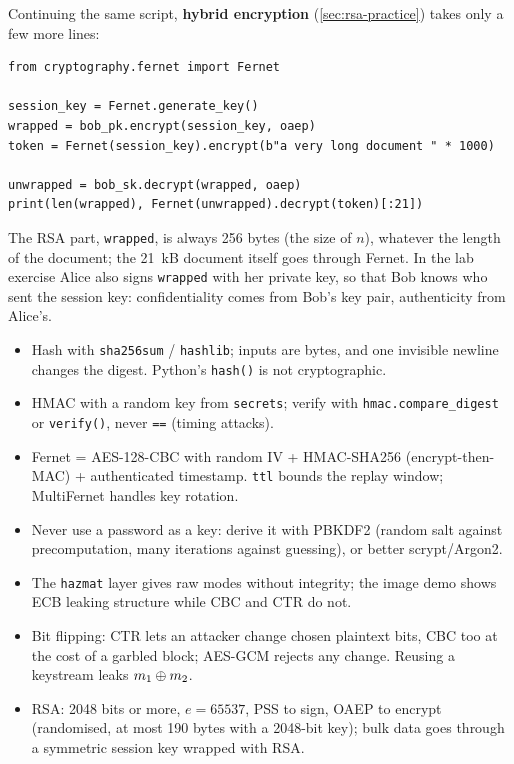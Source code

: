 Continuing the same script, \textbf{hybrid encryption} (\cref{sec:rsa-practice}) takes only a few more lines:

\begin{verbatim}
from cryptography.fernet import Fernet

session_key = Fernet.generate_key()
wrapped = bob_pk.encrypt(session_key, oaep)
token = Fernet(session_key).encrypt(b"a very long document " * 1000)

unwrapped = bob_sk.decrypt(wrapped, oaep)
print(len(wrapped), Fernet(unwrapped).decrypt(token)[:21])
\end{verbatim}

The RSA part, \texttt{wrapped}, is always 256 bytes (the size of $n$), whatever the length of the document; the 21~kB document itself goes through Fernet. In the lab exercise Alice also signs \texttt{wrapped} with her private key, so that Bob knows who sent the session key: confidentiality comes from Bob's key pair, authenticity from Alice's.

\begin{summary}
\begin{itemize}
    \item Hash with \texttt{sha256sum} / \texttt{hashlib}; inputs are bytes, and one invisible newline changes the digest. Python's \texttt{hash()} is not cryptographic.
    \item HMAC with a random key from \texttt{secrets}; verify with \texttt{hmac.compare\_digest} or \texttt{verify()}, never \texttt{==} (timing attacks).
    \item Fernet = AES-128-CBC with random IV + HMAC-SHA256 (encrypt-then-MAC) + authenticated timestamp. \texttt{ttl} bounds the replay window; MultiFernet handles key rotation.
    \item Never use a password as a key: derive it with PBKDF2 (random salt against precomputation, many iterations against guessing), or better scrypt/Argon2.
    \item The \texttt{hazmat} layer gives raw modes without integrity; the image demo shows ECB leaking structure while CBC and CTR do not.
    \item Bit flipping: CTR lets an attacker change chosen plaintext bits, CBC too at the cost of a garbled block; AES-GCM rejects any change. Reusing a keystream leaks $m_1 \oplus m_2$.
    \item RSA: 2048 bits or more, $e = 65537$, PSS to sign, OAEP to encrypt (randomised, at most 190 bytes with a 2048-bit key); bulk data goes through a symmetric session key wrapped with RSA.
\end{itemize}
\end{summary}

